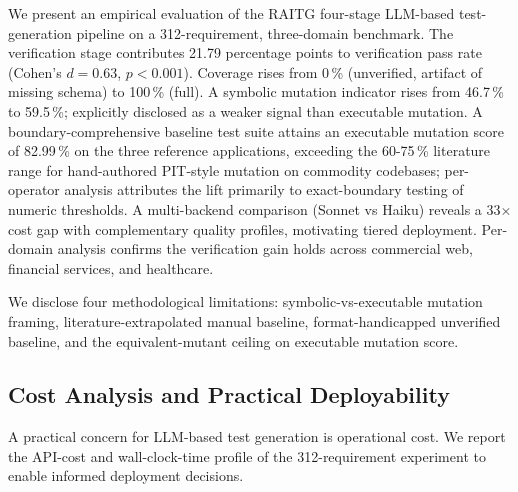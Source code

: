 \documentclass[review,12pt]{elsarticle}
\begin{document}
We present an empirical evaluation of the RAITG four-stage
LLM-based test-generation pipeline on a 312-requirement,
three-domain benchmark. The verification stage contributes 21.79
percentage points to verification pass rate (Cohen's $d = 0.63$,
$p < 0.001$). Coverage rises from 0\,\% (unverified, artifact of
missing schema) to 100\,\% (full). A symbolic mutation indicator
rises from 46.7\,\% to 59.5\,\%; explicitly disclosed as a
weaker signal than executable mutation. A boundary-comprehensive
baseline test suite attains an executable mutation score of
82.99\,\% on the three reference applications, exceeding the
60-75\,\% literature range for hand-authored PIT-style mutation on
commodity codebases; per-operator analysis attributes the lift
primarily to exact-boundary testing of numeric thresholds. A
multi-backend comparison (Sonnet vs Haiku) reveals a 33$\times$
cost gap with complementary quality profiles, motivating tiered
deployment. Per-domain analysis confirms the verification gain
holds across commercial web, financial services, and healthcare.

We disclose four methodological limitations: symbolic-vs-executable
mutation framing, literature-extrapolated manual baseline,
format-handicapped unverified baseline, and the
equivalent-mutant ceiling on executable mutation score.



\subsection{Cost Analysis and Practical Deployability}
\label{sec:cost_e}

A practical concern for LLM-based test generation is operational
cost. We report the API-cost and wall-clock-time profile of the
312-requirement experiment to enable informed deployment decisions.
\end{document}
